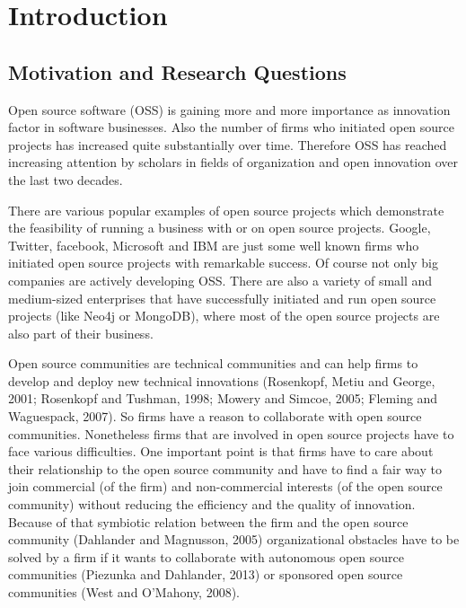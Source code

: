 \section{Introduction}

\subsection{Motivation and Research Questions}

Open source software (OSS) is gaining more and more importance as innovation factor in software businesses. Also the number of firms who initiated open source projects has increased quite substantially over time.  Therefore OSS has reached increasing attention by scholars in fields of organization and open innovation over the last two decades.

There are various popular examples of open source projects which demonstrate the feasibility of running a business with or on open source projects. Google, Twitter, facebook, Microsoft and IBM are just some well known firms who initiated open source projects with remarkable success. Of course not only big companies are actively developing OSS. There are also a variety of small and medium-sized enterprises that have successfully initiated and run open source projects (like Neo4j or MongoDB),  where most of the open source projects are also part of their business.

Open source communities are technical communities and can help firms to develop and deploy new technical innovations (Rosenkopf, Metiu and George, 2001; Rosenkopf and Tushman, 1998; Mowery and Simcoe, 2005; Fleming and Waguespack, 2007). So firms have a reason to collaborate with open source communities. Nonetheless firms that are involved in open source projects have to face various difficulties. One important point is that firms have to care about their relationship to the open source community and have to find a fair way to join commercial (of the firm) and non-commercial interests (of the open source community) without reducing the efficiency and the quality of innovation. Because of that symbiotic relation between the firm and the open source community (Dahlander and Magnusson, 2005) organizational obstacles have to be solved by a firm if it wants to collaborate with autonomous open source communities (Piezunka and Dahlander, 2013) or sponsored open source communities (West and O’Mahony, 2008).

